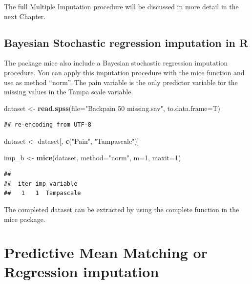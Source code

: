 \documentclass[]{book}
\newenvironment{Shaded}{\begin{snugshade}}{\end{snugshade}}
\newcommand{\KeywordTok}[1]{\textcolor[rgb]{0.13,0.29,0.53}{\textbf{#1}}}
\newcommand{\DataTypeTok}[1]{\textcolor[rgb]{0.13,0.29,0.53}{#1}}
\newcommand{\DecValTok}[1]{\textcolor[rgb]{0.00,0.00,0.81}{#1}}
\newcommand{\StringTok}[1]{\textcolor[rgb]{0.31,0.60,0.02}{#1}}
\newcommand{\NormalTok}[1]{#1}
\begin{document}
The full Multiple Imputation procedure will be discussed in more detail
in the next Chapter.

\subsection{Bayesian Stochastic regression imputation in
R}\label{bayesian-stochastic-regression-imputation-in-r}

The package mice also include a Bayesian stochastic regression
imputation procedure. You can apply this imputation procedure with the
mice function and use as method ``norm''. The pain variable is the only
predictor variable for the missing values in the Tampa scale variable.

\begin{Shaded}
\begin{Highlighting}[]
\NormalTok{dataset <-}\StringTok{ }\KeywordTok{read.spss}\NormalTok{(}\DataTypeTok{file=}\StringTok{"Backpain 50 missing.sav"}\NormalTok{, }\DataTypeTok{to.data.frame=}\NormalTok{T)}
\end{Highlighting}
\end{Shaded}

\begin{verbatim}
## re-encoding from UTF-8
\end{verbatim}

\begin{Shaded}
\begin{Highlighting}[]
\NormalTok{dataset <-}\StringTok{ }\NormalTok{dataset[, }\KeywordTok{c}\NormalTok{(}\StringTok{"Pain"}\NormalTok{, }\StringTok{"Tampascale"}\NormalTok{)]}

\NormalTok{imp_b <-}\StringTok{ }\KeywordTok{mice}\NormalTok{(dataset, }\DataTypeTok{method=}\StringTok{"norm"}\NormalTok{, }\DataTypeTok{m=}\DecValTok{1}\NormalTok{, }\DataTypeTok{maxit=}\DecValTok{1}\NormalTok{)}
\end{Highlighting}
\end{Shaded}

\begin{verbatim}
## 
##  iter imp variable
##   1   1  Tampascale
\end{verbatim}

The completed dataset can be extracted by using the complete function in
the mice package.

\section{Predictive Mean Matching or Regression
imputation}\label{predictive-mean-matching-or-regression-imputation}
\end{document}

